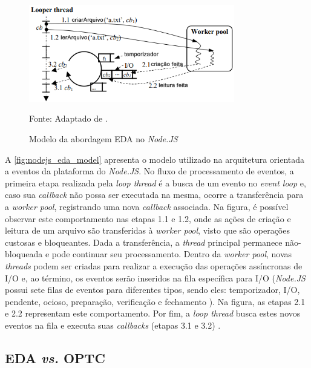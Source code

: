 \documentclass[12pt]{article}
\begin{document}
\begin{figure}[h]
\centering
\caption{Modelo da abordagem EDA no \textit{Node.JS}}
\includegraphics[width=0.8\textwidth]{images/pt-br/eda-arch-nodejs.png}
\label{fig:nodejs_eda_model}

Fonte: Adaptado de \cite{BUGS}.
\end{figure}

A \autoref{fig:nodejs_eda_model} apresenta o modelo utilizado na arquitetura orientada a eventos da plataforma do 
\textit{Node.JS}. No fluxo de processamento de eventos, a primeira etapa realizada pela \textit{loop thread} é 
a busca de um evento no \textit{event loop} e, caso sua \textit{callback} não possa ser executada na mesma, ocorre
a transferência para a \textit{worker pool}, registrando uma nova \textit{callback} associada. 
Na figura, é possível observar este comportamento nas etapas 1.1 e 1.2, onde as ações de criação e leitura de 
um arquivo são transferidas à \textit{worker pool}, visto que são operações custosas e bloqueantes. Dada 
a transferência, a \textit{thread} principal permanece não-bloqueada e pode continuar seu processamento. 
Dentro da \textit{worker pool}, novas \textit{threads} podem ser criadas para realizar a execução das operações
assíncronas de I/O e, ao término, os eventos serão inseridos na fila específica para I/O (\textit{Node.JS} 
possui sete filas de eventos para diferentes tipos, sendo eles: temporizador, I/O, pendente, ocioso, preparação, 
verificação e fechamento \cite{NODEEVENTLOOP}). Na figura, as etapas 2.1 e 2.2 representam este comportamento.
Por fim, a \textit{loop thread} busca estes novos eventos na fila e executa suas 
\textit{callbacks} (etapas 3.1 e 3.2) \cite{BUGS}.


\subsection{EDA \textit{vs.} OPTC}
\end{document}
